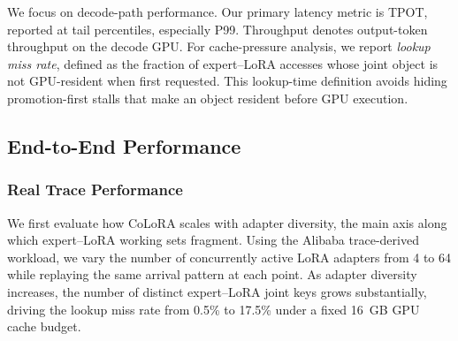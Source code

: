 \documentclass[sigplan,anonymous,review,10pt]{acmart}
\begin{document}
We focus on decode-path performance. Our primary latency metric is TPOT, reported at tail percentiles, especially P99. Throughput denotes output-token throughput on the decode GPU. For cache-pressure analysis, we report \emph{lookup miss rate}, defined as the fraction of expert--LoRA accesses whose joint object is not GPU-resident when first requested. This lookup-time definition avoids hiding promotion-first stalls that make an object resident before GPU execution.

\subsection{End-to-End Performance}
\label{subsec:e2e}

\subsubsection{Real Trace Performance}
\label{subsubsec:real-trace}

We first evaluate how CoLoRA scales with adapter diversity, the main axis along which expert--LoRA working sets fragment. Using the Alibaba trace-derived workload, we vary the number of concurrently active LoRA adapters from 4 to 64 while replaying the same arrival pattern at each point. As adapter diversity increases, the number of distinct expert--LoRA joint keys grows substantially, driving the lookup miss rate from 0.5\% to 17.5\% under a fixed 16~GB GPU cache budget.
\end{document}
